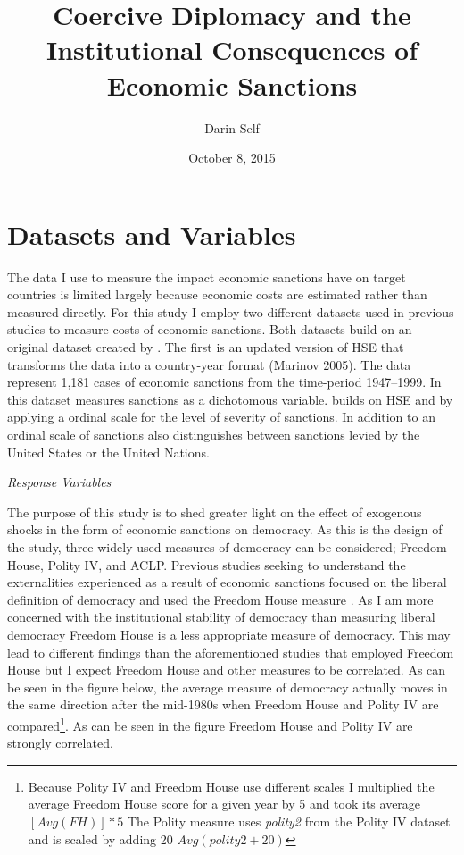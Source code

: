 \documentclass[a4paper]{article}\usepackage[]{graphicx}\usepackage[]{color}
\title{Coercive Diplomacy and the Institutional Consequences of Economic Sanctions}
\author{Darin Self}
\date{October 8, 2015}
\begin{document}
\maketitle
\clearpage
\section*{\large{Datasets and Variables}}

The data I use to measure the impact economic sanctions have on target countries is limited largely because economic costs are estimated rather than measured directly. For this study I employ two different datasets used in previous studies to measure costs of economic sanctions. Both datasets build on an original dataset created by \citet[Henceforth \textbf{HSE}]{hufbauer1990economic}. The first is an updated version of HSE that transforms the data into a country-year format (Marinov 2005). The data represent 1,181 cases of economic sanctions from the time-period 1947--1999. In this dataset \citet{marinov2005economic} measures sanctions as a dichotomous variable. \citet{wood2008hand} builds on HSE and \citet{marinov2005economic} by applying a ordinal scale for the level of severity of sanctions. In addition to an ordinal scale of sanctions \citet{wood2008hand} also distinguishes between sanctions levied by the United States or the United Nations. 

\centerline{\textit{Response Variables}}

\par
The purpose of this study is to shed greater light on the effect of exogenous shocks in the form of economic sanctions on democracy. As this is the design of the study, three widely used measures of democracy can be considered; Freedom House, Polity IV, and ACLP.  Previous studies seeking to understand the externalities experienced as a result of economic sanctions focused on the liberal definition of democracy and used the Freedom House measure \cite{lopez1997economic, peksen2009better, peksen2009economic, peksen2010coercive, pdeksen2010coercive, wood2008hand}. As I am more concerned with the institutional stability of democracy than measuring liberal democracy Freedom House is a less appropriate measure of democracy. This may lead to different findings than the aforementioned studies that employed Freedom House but I expect Freedom House and other measures to be correlated. As can be seen in the figure below, the average measure of democracy actually moves in the same direction after the mid-1980s when Freedom House and Polity IV are compared\footnote{Because Polity IV and Freedom House use different scales I multiplied the average Freedom House score for a given year by 5 and took its average $[Avg(FH)]*5$ The Polity measure uses \textit{polity2} from the Polity IV dataset and is scaled by adding 20 $Avg(polity2 +20)$}.  As can be seen in the figure Freedom House and Polity IV are strongly correlated.
\par
\end{document}
